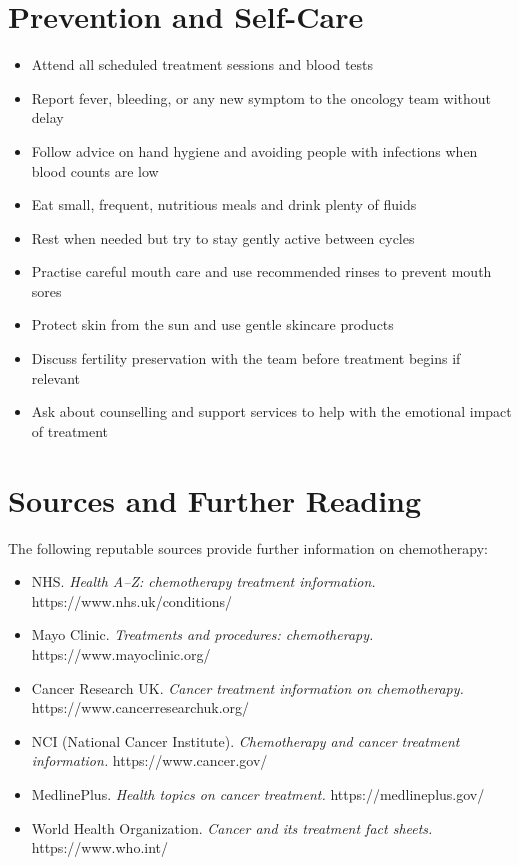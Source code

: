 \section*{Prevention and Self-Care}
\begin{itemize}
    \item Attend all scheduled treatment sessions and blood tests
    \item Report fever, bleeding, or any new symptom to the oncology team without delay
    \item Follow advice on hand hygiene and avoiding people with infections when blood counts are low
    \item Eat small, frequent, nutritious meals and drink plenty of fluids
    \item Rest when needed but try to stay gently active between cycles
    \item Practise careful mouth care and use recommended rinses to prevent mouth sores
    \item Protect skin from the sun and use gentle skincare products
    \item Discuss fertility preservation with the team before treatment begins if relevant
    \item Ask about counselling and support services to help with the emotional impact of treatment
\end{itemize}

\section*{Sources and Further Reading}
The following reputable sources provide further information on chemotherapy:
\begin{itemize}
    \item NHS. \textit{Health A--Z: chemotherapy treatment information.} https://www.nhs.uk/conditions/
    \item Mayo Clinic. \textit{Treatments and procedures: chemotherapy.} https://www.mayoclinic.org/
    \item Cancer Research UK. \textit{Cancer treatment information on chemotherapy.} https://www.cancerresearchuk.org/
    \item NCI (National Cancer Institute). \textit{Chemotherapy and cancer treatment information.} https://www.cancer.gov/
    \item MedlinePlus. \textit{Health topics on cancer treatment.} https://medlineplus.gov/
    \item World Health Organization. \textit{Cancer and its treatment fact sheets.} https://www.who.int/
\end{itemize}
